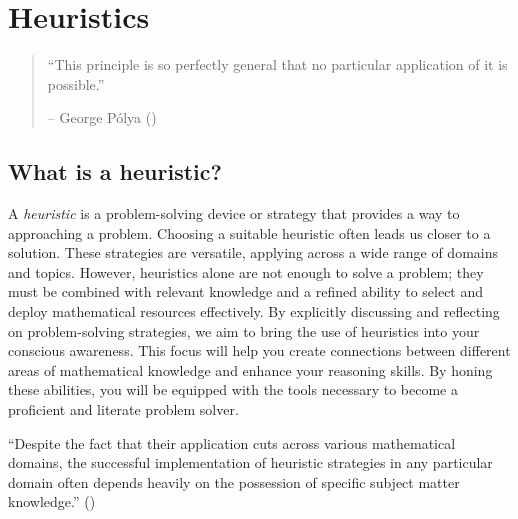 \documentclass[
  a4paper,
  DIV=11,
  numbers=noendperiod,
  oneside]{scrreprt}
\begin{document}
\restoregeometry

\chapter{Heuristics}\label{sec-heuristics}

\begin{quote}
``This principle is so perfectly general that no particular application
of it is possible.''

-- George Pólya ()
\end{quote}

\section{What is a heuristic?}\label{what-is-a-heuristic}

A \emph{heuristic} is a problem-solving device or strategy that provides
a way to approaching a problem. Choosing a suitable heuristic often
leads us closer to a solution. These strategies are versatile, applying
across a wide range of domains and topics. However, heuristics alone are
not enough to solve a problem; they must be combined with relevant
knowledge and a refined ability to select and deploy mathematical
resources effectively. By explicitly discussing and reflecting on
problem-solving strategies, we aim to bring the use of heuristics into
your conscious awareness. This focus will help you create connections
between different areas of mathematical knowledge and enhance your
reasoning skills. By honing these abilities, you will be equipped with
the tools necessary to become a proficient and literate problem solver.

\begin{tcolorbox}[enhanced jigsaw, colframe=quarto-callout-warning-color-frame, title=\textcolor{quarto-callout-warning-color}{\faExclamationTriangle}\hspace{0.5em}{Heuristics will not replace shaky mastery of a subject!}, breakable, opacityback=0, titlerule=0mm, colbacktitle=quarto-callout-warning-color!10!white, toptitle=1mm, colback=white, coltitle=black, toprule=.15mm, bottomtitle=1mm, left=2mm, arc=.35mm, rightrule=.15mm, bottomrule=.15mm, opacitybacktitle=0.6, leftrule=.75mm]

``Despite the fact that their application cuts across various
mathematical domains, the successful implementation of heuristic
strategies in any particular domain often depends heavily on the
possession of specific subject matter knowledge.''
()

\end{tcolorbox}
\end{document}
